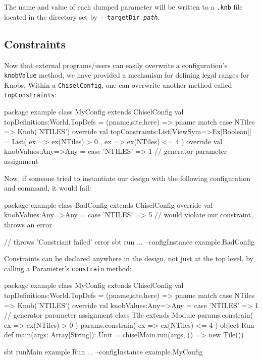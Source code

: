 \documentclass[10pt,twocolumn]{article}
\def\code#1{{\small\tt #1}}
\begin{document}
The name and value of each dumped parameter will be written to a \code{*.knb} file located in the directory set by \code{-{-}targetDir {\it path}}.

\subsection{Constraints}

Now that external programs/users can easily overwrite a configuration's \code{knobValue} method, we have provided a mechanism for defining legal ranges for Knobs. Within a \code{ChiselConfig}, one can overwrite another method called \code{topConstraints}:

\begin{scala}
package example
class MyConfig extends ChiselConfig {
  val topDefinitions:World.TopDefs = {
    (pname,site,here) => pname match {
      case NTiles => Knob('NTILES')
    }
  }
  override val topConstraints:List[ViewSym=>Ex[Boolean]] 
    = List( { ex => ex(NTiles) >  0 },
            { ex => ex(NTiles) <= 4 })
  override val knobValues:Any=>Any = {
    case 'NTILES' => 1 // generator parameter assignment
  }
}
\end{scala}

Now, if someone tried to instantiate our design with the following configuration and command, it would fail:

\begin{scala}
package example
class BadConfig extends ChiselConfig {
  override val knobValues:Any=>Any = {
    case 'NTILES' => 5 // would violate our constraint, throws an error
  }
}

// throws 'Constriant failed' error
sbt run ... --configInstance example.BadConfig 
\end{scala}

Constraints can be declared anywhere in the design, not just at the top level, by calling a Parameter's \code{constrain} method:

\begin{scala}
package example
class MyConfig extends ChiselConfig {
  val topDefinitions:World.TopDefs = {
    (pname,site,here) => pname match {
      case NTiles => Knob('NTILES')
    }
  }
  override val knobValues:Any=>Any = {
    case 'NTILES' => 1 // generator parameter assignment
  }
}
class Tile extends Module {
  params.constrain( ex => ex(NTiles) >  0 )
  params.constrain( ex => ex(NTiles) <= 4 )
}
object Run { 
  def main(args: Array[String]): Unit = {
    chiselMain.run(args, () => new Tile())
  }
}

sbt runMain example.Run ... --configInstance example.MyConfig
\end{scala}
\end{document}
